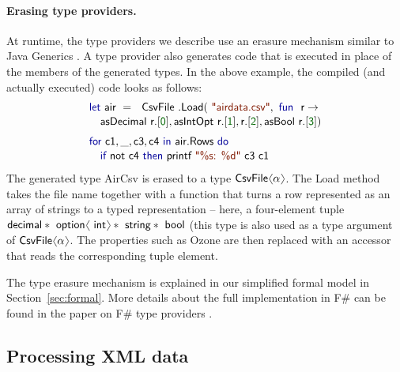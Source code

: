 \documentclass[preprint]{sigplanconf}
\newcommand{\langl}{\begin{picture}(4.5,7)
\put(1.1,2.5){\rotatebox{60}{\line(1,0){5.5}}}
\put(1.1,2.5){\rotatebox{300}{\line(1,0){5.5}}}
\end{picture}}
\newcommand{\rangl}{\begin{picture}(4.5,7)
\put(.9,2.5){\rotatebox{120}{\line(1,0){5.5}}}
\put(.9,2.5){\rotatebox{240}{\line(1,0){5.5}}}
\end{picture}}
\newcommand{\kvd}[1]{\textnormal{\textcolor{kvdclr}{\sffamily #1}}}
\newcommand{\num}[1]{\textnormal{\textcolor{numclr}{\sffamily #1}}}
\newcommand{\str}[1]{\textnormal{\textcolor{strclr}{\sffamily "#1"}}}
\newcommand{\ident}[1]{\textnormal{\sffamily #1}}
\begin{document}
\paragraph{Erasing type providers.}
At runtime, the type providers we describe use an erasure mechanism similar to Java Generics \cite{java-erasure}. 
A type provider also generates code that is executed in place of the members of the generated types.
In the above example, the compiled (and actually executed) code looks as follows:
%
\begin{equation*}
\begin{array}{l}
 \kvd{let}~\ident{air}~=~\ident{CsvFile}\ident{.Load}(\str{airdata.csv}, \kvd{fun}~\ident{r}\rightarrow\\[0.1em]
 \quad \ident{asDecimal r}.[\num{0}], \ident{asIntOpt r}.[\num{1}], \ident{r}.[\num{2}], \ident{asBool r}.[\num{3}])\\[0.6em]
 \kvd{for}~\ident{c1},\_,\ident{c3},\ident{c4} ~\kvd{in}~\ident{air.Rows}~\kvd{do}\\[0.1em]
 \quad\kvd{if}~\ident{not}~\ident{c4}~\kvd{then}~\ident{printf}~\str{\%s: \%d}~\ident{c3 c1}\\
\end{array}
\end{equation*}
%
The generated type \ident{AirCsv} is erased to a type $\ident{CsvFile}\langl\alpha\rangl$.
The \ident{Load} method takes the file name together with a function that turns a row represented 
as an array of strings to a typed representation -- here, a four-element tuple 
$\ident{decimal}*\ident{option}\langl\ident{int}\rangl*\ident{string}*\ident{bool}$ (this type
is also used as a type argument of $\ident{CsvFile}\langl\alpha\rangl$. The properties
such as \ident{Ozone} are then replaced with an accessor that reads the corresponding tuple
element.

The type erasure mechanism is explained in our simplified formal model in Section~\ref{sec:formal}.
More details about the full implementation in F\# can be found in the paper on F\# type 
providers \cite{fsharp-typeprov}.


\subsection{Processing XML data}
\label{sec:providers-xml}
\end{document}
